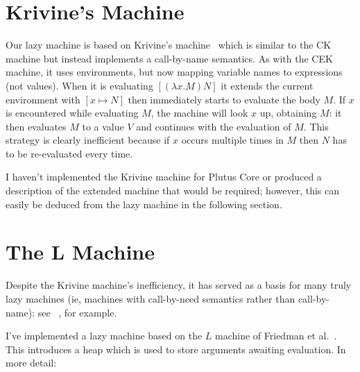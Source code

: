 \documentclass[a4paper]{article}
\begin{document}
\newpage

\newpage

\section{Krivine's Machine}
Our lazy machine is based on Krivine's machine~\cite{Krivine} which is
similar to the CK machine but instead implements a call-by-name
semantics.  As with the CEK machine, it uses environments, but now
mapping variable names to expressions (not values).  When it is
evaluating $[(\lambda x.M) N]$ it extends the current environment with
$[x \mapsto N]$ then immediately starts to evaluate the body $M$.  If
$x$ is encountered while evaluating $M$, the machine will look $x$ up,
obtaining $M$: it then evaluates $M$ to a value $V$ and continues with
the evaluation of $M$.  This strategy is clearly inefficient because
if $x$ occurs multiple times in $M$ then $N$ has to be re-evaluated
every time.

I haven't implemented the Krivine machine for Plutus Core or produced
a description of the extended machine that would be required; however,
this can easily be deduced from the lazy machine in the following
section.




\section{The L Machine}
Despite the Krivine machine's inefficiency, it has served as a basis
for many truly lazy machines (ie, machines with call-by-need
semantics rather than call-by-name): see ~\cite{Sestoft, Friedman,
  Douence}, for example.

I've implemented a lazy machine based on the $L$ machine of 
Friedman et al.~\cite{Friedman}.  This introduces a heap which
is used to store arguments awaiting evaluation.  In more
detail:
\end{document}
